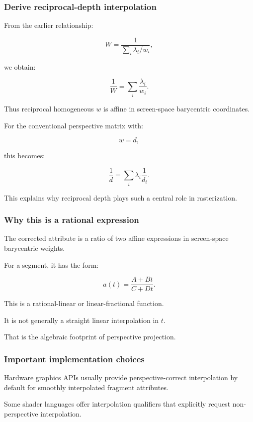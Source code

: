 \subsubsection{Derive reciprocal-depth interpolation}\label{derive-reciprocal-depth-interpolation}

From the earlier relationship:

\[
 W=\frac1{\sum_i\lambda_i/w_i},
\]

we obtain:

\[
 \boxed{ \frac1W= \sum_i\frac{\lambda_i}{w_i} }.
\]

Thus reciprocal homogeneous \(w\) is affine in screen-space barycentric coordinates.

For the conventional perspective matrix with:

\[
 w=d,
\]

this becomes:

\[
 \boxed{ \frac1d= \sum_i\lambda_i\frac1{d_i} }.
\]

This explains why reciprocal depth plays such a central role in rasterization.

\subsubsection{Why this is a rational expression}\label{why-this-is-a-rational-expression}

The corrected attribute is a ratio of two affine expressions in screen-space barycentric weights.

For a segment, it has the form:

\[
 a(t)= \frac{A+Bt}{C+Dt}.
\]

This is a rational-linear or linear-fractional function.

It is not generally a straight linear interpolation in \(t\).

That is the algebraic footprint of perspective projection.

\subsubsection{Important implementation choices}\label{important-implementation-choices}

Hardware graphics APIs usually provide perspective-correct interpolation by default for smoothly interpolated fragment attributes.

Some shader languages offer interpolation qualifiers that explicitly request non-perspective interpolation.

